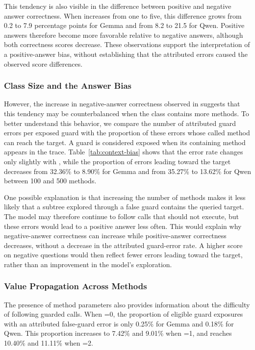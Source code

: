 This tendency is also visible in the difference between positive and negative answer correctness. When  increases from one to five, this difference grows from 0.2 to 7.9 percentage points for Gemma and from 8.2 to 21.5 for Qwen. Positive answers therefore become more favorable relative to negative answers, although both correctness scores decrease. These observations support the interpretation of a positive-answer bias, without establishing that the attributed errors caused the observed score differences.

\subsubsection{Class Size and the Answer Bias}

However, the increase in negative-answer correctness observed in  suggests that this tendency may be counterbalanced when the class contains more methods. To better understand this behavior, we compare the number of attributed guard errors per exposed guard with the proportion of these errors whose called method can reach the target. A guard is considered exposed when its containing method appears in the trace. Table~\ref{tab:context-bias} shows that the error rate changes only slightly with , while the proportion of errors leading toward the target decreases from 32.36\% to 8.90\% for Gemma and from 35.27\% to 13.62\% for Qwen between 100 and 500 methods.



One possible explanation is that increasing the number of methods makes it less likely that a subtree explored through a false guard contains the queried target. The model may therefore continue to follow calls that should not execute, but these errors would lead to a positive answer less often. This would explain why negative-answer correctness can increase while positive-answer correctness decreases, without a decrease in the attributed guard-error rate. A higher score on negative questions would then reflect fewer errors leading toward the target, rather than an improvement in the model's exploration.

\subsubsection{Value Propagation Across Methods}
\label{subsec:value-origin}

The presence of method parameters also provides information about the difficulty of following guarded calls. When =0, the proportion of eligible guard exposures with an attributed false-guard error is only 0.25\% for Gemma and 0.18\% for Qwen. This proportion increases to 7.42\% and 9.01\% when =1, and reaches 10.40\% and 11.11\% when =2.

